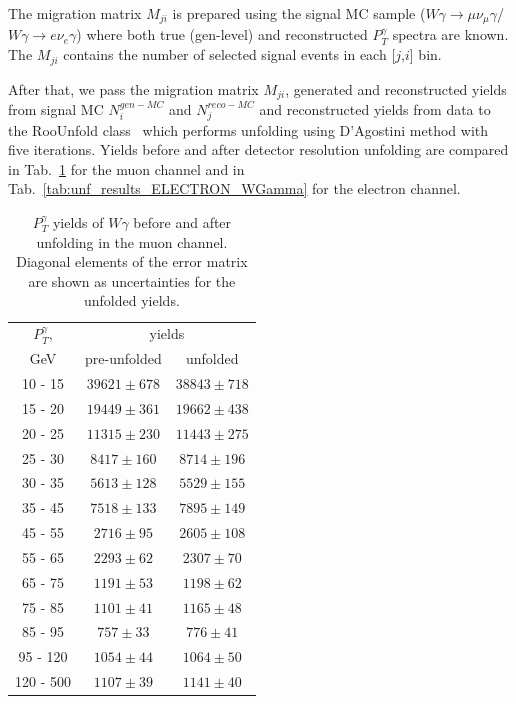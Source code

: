 
The migration matrix $M_{ji}$ is prepared using the signal MC sample ($W\gamma\rightarrow\mu\nu_{\mu}\gamma$/$W\gamma\rightarrow{e}\nu_{e}\gamma$) where both true (gen-level) and reconstructed $P_T^\gamma$ spectra are known. The $M_{ji}$ contains the number of selected signal events in each [$j$,$i$] bin. 

After that, we pass the migration matrix $M_{ji}$, generated and reconstructed yields from signal MC $N^{gen-MC}_i$ and $N^{reco-MC}_j$ and reconstructed yields from data to the RooUnfold class~\cite{ref_RooUnfold} which performs unfolding using D'Agostini method with five iterations. Yields before and after detector resolution unfolding are compared in Tab.~\ref{tab:unf_results_MUON_WGamma} for the muon channel and in Tab.~\ref{tab:unf_results_ELECTRON_WGamma} for the electron channel. 

\begin{table}[h]
  \scriptsize
  \begin{center}
  \caption{$P_T^{\gamma}$ yields of $W\gamma$ before and after unfolding in the muon channel. Diagonal elements of the error matrix are shown as uncertainties for the unfolded yields.}
  \begin{tabular}{|c|c|c|}
\hline
  $P_T^{\gamma}$, &  \multicolumn{2}{|c|}{yields} \\ 
  GeV           & pre-unfolded &  unfolded  \\ \hline

 10 -  15 &     $39621 \pm 678$ &     $38843 \pm 718$  \\ \hline
 15 -  20 &     $19449 \pm 361$ &     $19662 \pm 438$  \\ \hline
 20 -  25 &     $11315 \pm 230$ &     $11443 \pm 275$  \\ \hline
 25 -  30 &     $8417 \pm 160$ &     $8714 \pm 196$  \\ \hline
 30 -  35 &     $5613 \pm 128$ &     $5529 \pm 155$  \\ \hline
 35 -  45 &     $7518 \pm 133$ &     $7895 \pm 149$  \\ \hline
 45 -  55 &     $2716 \pm  95$ &     $2605 \pm 108$  \\ \hline
 55 -  65 &     $2293 \pm  62$ &     $2307 \pm  70$  \\ \hline
 65 -  75 &     $1191 \pm  53$ &     $1198 \pm  62$  \\ \hline
 75 -  85 &     $1101 \pm  41$ &     $1165 \pm  48$  \\ \hline
 85 -  95 &     $757 \pm  33$ &     $776 \pm  41$  \\ \hline
 95 - 120 &     $1054 \pm  44$ &     $1064 \pm  50$  \\ \hline
120 - 500 &     $1107 \pm  39$ &     $1141 \pm  40$  \\ \hline
  \end{tabular}
  \label{tab:unf_results_MUON_WGamma}
  \end{center}
\end{table}

